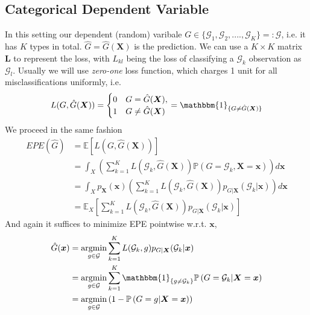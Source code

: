 \documentclass[a4paper, 11pt]{article}
\DeclareMathOperator*{\argmin}{argmin}
\begin{document}
\subsection{Categorical Dependent Variable}
In this setting our dependent (random) varibale $G\in \{\mathcal{G}_1, \mathcal{G}_2, ...., \mathcal{G}_K\} =: \mathcal{G}$, i.e. it has $K$ types in total. $\hat{G}=\hat{G}(\bm{X})$ is the prediction. We can use a $K\times K$ matrix $\bm{L}$ to represent the loss, with $L_{kl}$ being the loss of classifying a $\mathcal{G}_k$ observation as $\mathcal{G}_l$. Usually we will use \emph{zero-one} loss function, which charges 1 unit for all misclassifications uniformly, i.e.
\begin{equation}
	L(G, \hat{G}(\bm{X})) = 
	\begin{cases}
	0 & G = \hat{G}(\bm{X}),\\
	1 & G \ne \hat{G}(\bm{X})
	\end{cases}
	= \mathbbm{1}_{\{G \ne \hat{G}(\bm{X})\}}
\end{equation}
We proceed in the same fashion
\begin{equation}
	\begin{split}
		EPE(\hat{G}) &= \mathbb{E}\left[L(G, \hat{G}(\bm{X}))\right] \\
		&= \int_X \left(\sum_{k=1}^K L(\mathcal{G}_k, \hat{G}(\bm{X})) \mathbb{P}\left(G=\mathcal{G}_k, \bm{X}=\bm{x}\right) \right)d \bm{x} \\
		&= \int_X p_{\bm{X}}(\bm{x})\left(\sum_{k=1}^K L(\mathcal{G}_k, \hat{G}(\bm{X})) p_{G|\bm{X}}(\mathcal{G}_k|\bm{x}) \right)d \bm{x} \\
		&= \mathbb{E}_X\left[\sum_{k=1}^K L(\mathcal{G}_k, \hat{G}(\bm{X})) p_{G|\bm{X}}(\mathcal{G}_k|\bm{x})\right]
	\end{split}
\end{equation}
And again it suffices to minimize EPE pointwise w.r.t. $\bm{x}$,
\begin{equation}
\begin{split}
	\hat{G}(\bm{x}) &= \argmin\limits_{g \in \mathcal{G}} 	\sum_{k=1}^K L(\mathcal{G}_k, g) p_{G|\bm{X}}(\mathcal{G}_k|\bm{x}) \\
	&= \argmin\limits_{g \in \mathcal{G}} 	\sum_{k=1}^K \mathbbm{1}_{\{g\ne\mathcal{G}_k\}} \mathbb{P}\left(G=\mathcal{G}_k|\bm{X}=\bm{x}\right)\\
	&= \argmin\limits_{g \in \mathcal{G}} \left(1- \mathbb{P}\left(G=g|\bm{X}=\bm{x}\right)\right)
\end{split}
\end{equation}
\end{document}
